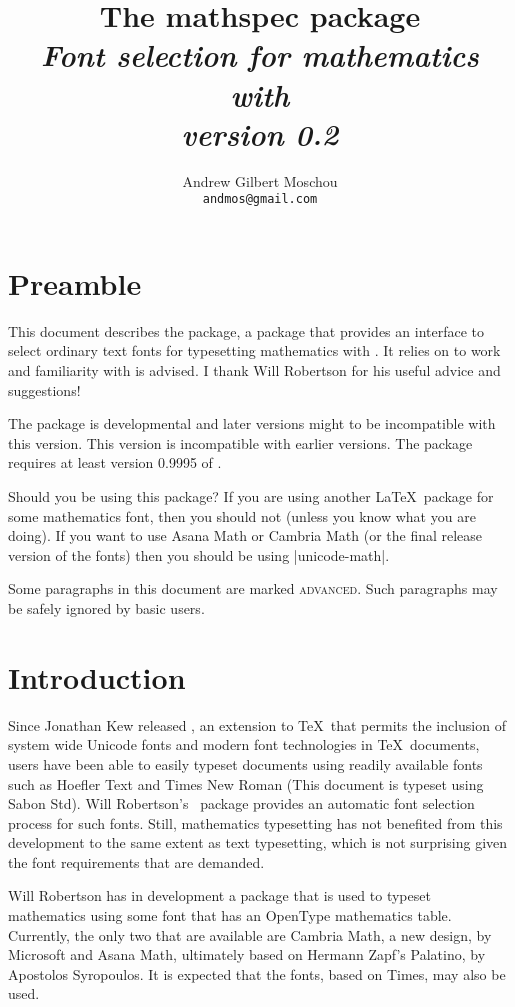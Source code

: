 \documentclass{ltxdockit}
\title{The \textsf{\spotcolor mathspec} package\\[0.25em]\mdseries\itshape\normalsize Font selection for mathematics with \XeLaTeX\\[1ex]\mdseries\upshape version 0.2}
\author{Andrew Gilbert Moschou\\\texttt{andmos@gmail.com}}
\begin{document}
\maketitle

\tableofcontents

\section{Preamble}

This document describes the  package, a package that provides an interface to select ordinary text fonts for typesetting mathematics with \XeLaTeX. It relies on  to work and familiarity with  is advised. I thank Will Robertson for his useful advice and suggestions!

The package is developmental and later versions might to be incompatible with this version. This version is incompatible with earlier versions. The package requires at least version 0.9995 of \XeTeX.

Should you be using this package? If you are using another \LaTeX\ package for some mathematics font, then you should not (unless you know what you are doing). If you want to use Asana Math or Cambria Math (or the final release version of the  fonts) then you should be using |unicode-math|.

Some paragraphs in this document are marked \textsc{\spotcolor advanced}. Such paragraphs may be safely ignored by basic users.

\section{Introduction}

Since Jonathan Kew released \XeTeX, an extension to \TeX\ that permits the inclusion of system wide Unicode fonts and modern font technologies in \TeX\ documents, users have been able to easily typeset documents using readily available fonts such as Hoefler Text and Times New Roman (This document is typeset using Sabon  Std). Will Robertson’s \XeLaTeX\ package  provides an automatic font selection process for such fonts. Still, mathematics typesetting has not benefited from this development to the same extent as text typesetting, which is not surprising given the font requirements that are demanded.

Will Robertson has in development a package  that is used to typeset mathematics using some font that has an OpenType mathematics table. Currently, the only two that are available are Cambria Math, a new design, by Microsoft and Asana Math, ultimately based on Hermann Zapf’s Palatino, by Apostolos Syropoulos. It is expected that the  fonts, based on Times, may also be used.
\end{document}

